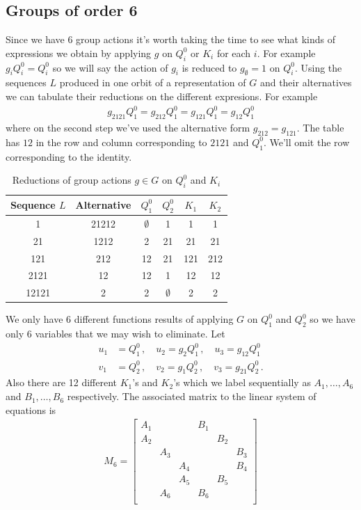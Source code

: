\subsection{Groups of order 6}
Since we have 6 group actions it's worth taking the time to see what kinds of expressions we obtain by applying $g$ on $Q_i^0$ or $K_i$ for each $i$. For example $g_i Q_i^0 = Q_i^0$ so we will say the action of $g_i$ is reduced to $g_{\emptyset} = 1$ on $Q_i^0$. Using the sequences $L$ produced in one orbit of a representation of $G$ and their alternatives we can tabulate their reductions on the different expresions. For example
\begin{align}
g_{2121}Q_1^0 = g_{212}Q_1^0 = g_{121} Q_1^0 = g_{12}Q_1^0
\end{align}
where on the second step we've used the alternative form $g_{212} = g_{121}$. The table has $12$  in the row and column corresponding to $2121$ and $Q_1^0$. We'll omit the row corresponding to the identity.
\begin{table}[H]
    \caption{Reductions of group actions $g \in G$ on $Q_i^0$ and $K_i$}
    \label{tbl:tableG6}
    \centering
    \begin{tabular}{cccccc}
    \toprule
    Sequence $L$ & Alternative & $Q_1^0$ & $Q_2^0$ & $K_1$ & $K_2$ \\ 
    \midrule
    1 & 21212 & $\emptyset$ & 1& 1& 1 \\
    21 &  1212& 2& 21 & 21& 21  \\
    121 & 212 & 12& 21& 121& 212 \\
    2121 & 12 &  12 & 1 & 12 & 12 \\
    12121 & 2 &  2& $\emptyset$& 2& 2 \\
    \bottomrule
    \end{tabular}
\end{table}
We only have 6 different functions results of applying $G$ on $Q_1^0$ and $Q_2^0$ so we have only 6 variables that we may wish to eliminate.  Let
\begin{align}
	u_1 &= Q_1^0\,,\quad u_2 = g_2 Q_1^0\,,\quad u_3 = g_{12}Q_1^0\\
	v_1 &= Q_2^0\,,\quad v_2 = g_1 Q_2^0\,,\quad v_3 = g_{21}Q_2^0\,.
\end{align}
Also there are 12 different $K_1$'s and $K_2$'s which we label sequentially as $A_1,\ldots,A_6$ and $B_1,\ldots,B_6$ respectively. The associated matrix to the linear system of equations is
\begin{align}
	M_6 = \begin{bmatrix}
	A_1& & & B_1 & & \\
	A_2& & & & B_2& \\
	& A_3& & & & B_3\\
	& & A_4 & & & B_4\\
	& & A_5& & B_5& \\
	&A_6 & &B_6 & & \\
	\end{bmatrix}
\end{align}
